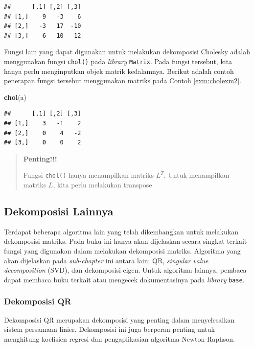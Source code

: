 \documentclass[]{book}
\newenvironment{Shaded}{\begin{snugshade}}{\end{snugshade}}
\newcommand{\KeywordTok}[1]{\textcolor[rgb]{0.13,0.29,0.53}{\textbf{#1}}}
\newcommand{\NormalTok}[1]{#1}
\theoremstyle{definition}
\theoremstyle{definition}
\theoremstyle{definition}
\theoremstyle{remark}
\begin{document}
\begin{verbatim}
##      [,1] [,2] [,3]
## [1,]    9   -3    6
## [2,]   -3   17  -10
## [3,]    6  -10   12
\end{verbatim}

Fungsi lain yang dapat digunakan untuk melakukan dekomposisi Cholesky adalah menggunakan fungsi \texttt{chol()} pada \emph{library} \texttt{Matrix}. Pada fungsi tersebut, kita hanya perlu menginputkan objek matrik kedalamnya. Berikut adalah contoh penerapan fungsi tersebut menggunakan matriks pada Contoh \ref{exm:cholexm2}.

\begin{Shaded}
\begin{Highlighting}[]
\KeywordTok{chol}\NormalTok{(a)}
\end{Highlighting}
\end{Shaded}

\begin{verbatim}
##      [,1] [,2] [,3]
## [1,]    3   -1    2
## [2,]    0    4   -2
## [3,]    0    0    2
\end{verbatim}

\begin{quote}
\textbf{Penting!!!}

Fungsi \texttt{chol()} hanya menampilkan matriks \(L^T\). Untuk menampilkan matriks \(L\), kita perlu melakukan transpose
\end{quote}

\hypertarget{othersdecomp}{%
\subsection{Dekomposisi Lainnya}\label{othersdecomp}}

Terdapat beberapa algoritma lain yang telah dikembangkan untuk melakukan dekomposisi matriks. Pada buku ini hanya akan dijelaskan secara singkat terkait fungsi yang digunakan dalam melakukan dekomposisi matriks. Algoritma yang akan dijelaskan pada \emph{sub-chapter} ini antara lain: QR, \emph{singular value decomposition} (SVD), dan dekomposisi eigen. Untuk algoritma lainnya, pembaca dapat membaca buku terkait atau mengecek dokumentasinya pada \emph{library} \texttt{base}.

\hypertarget{qrdecomp}{%
\subsubsection{Dekomposisi QR}\label{qrdecomp}}

Dekomposisi QR merupakan dekomposisi yang penting dalam menyelesaikan sistem persamaan linier. Dekomposisi ini juga berperan penting untuk menghitung koefisien regresi dan pengaplikasian algoritma Newton-Raphson.
\end{document}
